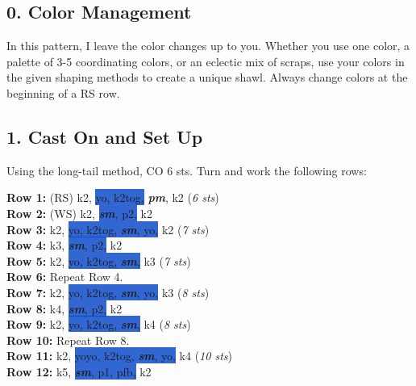 \documentclass[12pt]{article}
\newcommand{\vocab}[1]{\emph{\textbf{#1}}} %
\newcommand{\rowDir}[1]{\textbf{#1:}} %
\newcommand{\stitchcount}[1]{(\emph{#1 sts})}
\newcommand{\spine}[1]{\colorbox{highlight}{#1}}
\renewcommand{\pm}{\vocab{pm}} %
\newcommand{\sm}{\vocab{sm}} %
\newenvironment{unframed}
    {%
	\begin{addmargin}[2em]{0pt}
	\small
	\setlength{\parindent}{-2em}}
    {\vspace{1em}
	\normalsize
	\end{addmargin}
	\setlength{\parindent}{0em}}
\begin{document}
\begin{multicols}{2}
\section*{0. Color Management}
In this pattern, I leave the color changes up to you. Whether you use one color, a palette of 3-5 coordinating colors, or an eclectic mix of scraps, use your colors in the given shaping methods to create a unique shawl. Always change colors at the beginning of a RS row.



\subsection*{1. Cast On and Set Up}

Using the long-tail method, CO 6 sts. Turn and work the following rows:
\begin{unframed}
\rowDir{Row 1} (RS) k2, \spine{yo, k2tog,} \pm, k2 \stitchcount{6} \\
\rowDir{Row 2} (WS) k2, \spine{\sm, p2,} k2  \\
\rowDir{Row 3} k2, \spine{yo, k2tog, \sm, yo,} k2 \stitchcount{7} \\
\rowDir{Row 4} k3, \spine{\sm, p2,} k2 \\
\rowDir{Row 5} k2, \spine{yo, k2tog, \sm,} k3 \stitchcount{7} \\
\rowDir{Row 6} Repeat Row 4. \\
\rowDir{Row 7} k2, \spine{yo, k2tog, \sm, yo,} k3 \stitchcount{8} \\
\rowDir{Row 8} k4, \spine{\sm, p2,} k2 \\
\rowDir{Row 9} k2, \spine{yo, k2tog, \sm,} k4 \stitchcount{8} \\
\rowDir{Row 10} Repeat Row 8. \\
\rowDir{Row 11} k2, \spine{yoyo, k2tog, \sm, yo,} k4 \stitchcount{10} \\
\rowDir{Row 12} k5, \spine{\sm, p1, pfb,} k2 \\
\end{unframed}


\vfill
\columnbreak

\end{multicols}
\end{document}
